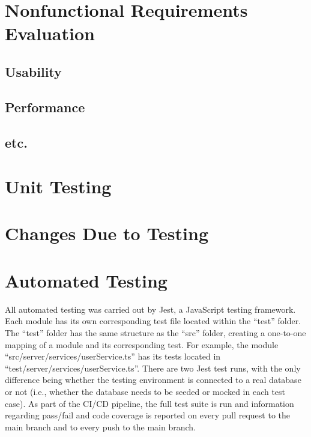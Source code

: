 \documentclass[12pt, titlepage]{article}
\begin{document}
\section{Nonfunctional Requirements Evaluation}

\subsection{Usability}

\subsection{Performance}

\subsection{etc.}

\section{Unit Testing}

\section{Changes Due to Testing}


\section{Automated Testing}

All automated testing was carried out by Jest, a JavaScript testing framework. Each module has its
own corresponding test file located within the ``test'' folder. The ``test'' folder has the same
structure as the ``src'' folder, creating a one-to-one mapping of a module and its corresponding
test. For example, the module ``src/server/services/userService.ts'' has its tests located in
``test/server/services/userService.ts''. There are two Jest test runs, with the only difference
being whether the testing environment is connected to a real database or not (i.e., whether the
database needs to be seeded or mocked in each test case). As part of the CI/CD pipeline, the full
test suite is run and information regarding pass/fail and code coverage is reported on every pull
request to the main branch and to every push to the main branch.
\end{document}

